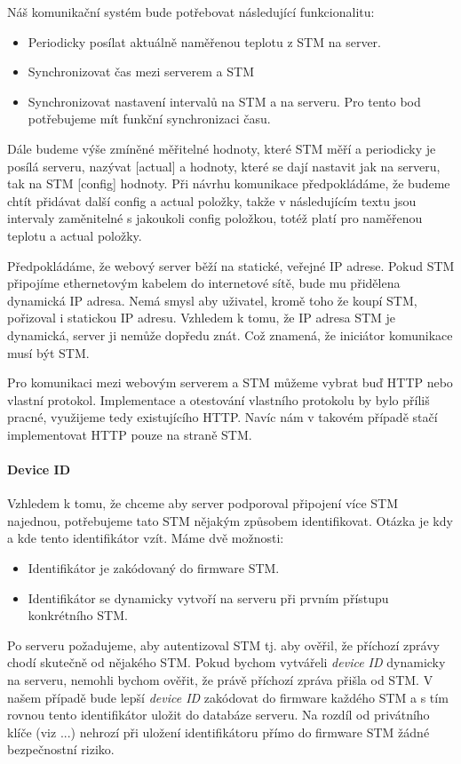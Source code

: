 
Náš komunikační systém bude potřebovat následující funkcionalitu:
\begin{itemize}
    \item Periodicky posílat aktuálně naměřenou teplotu z STM na server.
    \item Synchronizovat čas mezi serverem a STM
    \item Synchronizovat nastavení intervalů na STM a na serveru.
          Pro tento bod potřebujeme mít funkční synchronizaci času.
\end{itemize}

Dále budeme výše zmíněné měřitelné hodnoty, které STM měří a periodicky je posílá
serveru, nazývat [actual] a hodnoty, které se dají nastavit jak na serveru, tak na
STM [config] hodnoty.
Při návrhu komunikace předpokládáme, že budeme chtít přidávat další config a actual
položky, takže v následujícím textu jsou intervaly zaměnitelné s jakoukoli
config položkou, totéž platí pro naměřenou teplotu a actual položky.

Předpokládáme, že webový server běží na statické, veřejné IP adrese.
Pokud STM připojíme ethernetovým kabelem do internetové sítě, bude mu přidělena dynamická IP adresa.
Nemá smysl aby uživatel, kromě toho že koupí STM, pořizoval i statickou IP adresu.
Vzhledem k tomu, že IP adresa STM je dynamická, server ji nemůže dopředu znát.
Což znamená, že iniciátor komunikace musí být STM.

Pro komunikaci mezi webovým serverem a STM můžeme vybrat buď HTTP nebo vlastní protokol.
Implementace a otestování vlastního protokolu by bylo příliš pracné, využijeme tedy existujícího HTTP.
Navíc nám v takovém případě stačí implementovat HTTP pouze na straně STM.

\paragraph{Device ID}
Vzhledem k tomu, že chceme aby server podporoval připojení více STM najednou, potřebujeme
tato STM nějakým způsobem identifikovat.
Otázka je kdy a kde tento identifikátor vzít.
Máme dvě možnosti:
\begin{itemize}
  \item Identifikátor je zakódovaný do firmware STM.
  \item Identifikátor se dynamicky vytvoří na serveru při prvním přístupu konkrétního STM.
\end{itemize}
Po serveru požadujeme, aby autentizoval STM tj. aby ověřil, že příchozí zprávy chodí skutečně
od nějakého STM.
Pokud bychom vytvářeli \emph{device ID} dynamicky na serveru, nemohli bychom ověřit, že právě
příchozí zpráva přišla od STM.
V našem případě bude lepší \emph{device ID} zakódovat do firmware každého STM a s tím rovnou
tento identifikátor uložit do databáze serveru.
Na rozdíl od privátního klíče (viz ...) nehrozí při uložení identifikátoru přímo do firmware STM
žádné bezpečnostní riziko.

